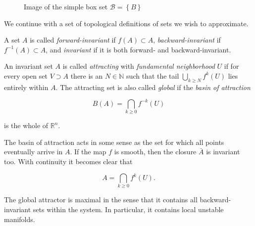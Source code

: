 \begin{figure}[ht]
    \caption{Image of the simple box set $\mathcal{B} = \left\{ B \right\}$}
    \label{fig:boximage}
\end{figure}

We continue with a set of topological definitions of sets we wish to approximate.

\begin{definition}
    \cite*{algGAIO} A set $A$ is called \emph{forward-invariant} if $f(A) \subset A$, 
    \emph{backward-invariant} if $f^{-1}(A) \subset A$, and \emph{invariant} if it is
    both forward- and backward-invariant.
\end{definition}

\begin{definition}
    \cite*{subalg} An invariant set $A$ is called \emph{attracting} with \emph{fundamental neighborhood}
    $U$ if for every open set $V \supset A$ there is an $N \in \mathbb{N}$ such that the tail 
    $\bigcup_{k \geq N} f^k(U)$ lies entirely within $A$. The attracting 
    set is also called \emph{global} if the \emph{basin of attraction} 
    
    \begin{equation}\label{eq:globattr}
        B(A) = \bigcap\limits_{k \geq 0} f^{-k}(U)
    \end{equation}

    is the whole of $\mathbb{R}^n$.
\end{definition}

The basin of attraction acts in some sense as the set for which all points eventually arrive
in $A$. If the map $f$ is smooth, then the closure $\bar{A}$ is invariant too. With continuity 
it becomes clear that

\begin{equation}
    A = \bigcap\limits_{k \geq 0} f^k(U).
\end{equation}

The global attractor is maximal in the sense that it contains all backward-invariant 
sets within the system. In particular, it contains local unstable manifolds.

